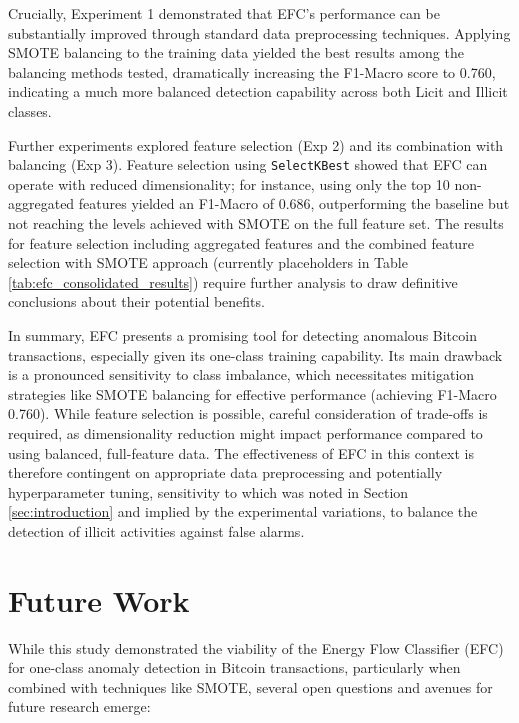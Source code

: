 \documentclass[12pt]{article}
\begin{document}
Crucially, Experiment 1 demonstrated that EFC's performance can be substantially improved through standard data preprocessing
techniques. Applying SMOTE balancing to the training data yielded the best results among the balancing methods tested,
dramatically increasing the F1-Macro score to 0.760, indicating a much more balanced detection capability across both
Licit and Illicit classes.

Further experiments explored feature selection (Exp 2) and its combination with balancing (Exp 3). Feature selection using
\texttt{SelectKBest} showed that EFC can operate with reduced dimensionality; for instance, using only the top 10 non-aggregated
features yielded an F1-Macro of 0.686, outperforming the baseline but not reaching the levels achieved with SMOTE on the full
feature set. The results for feature selection including aggregated features and the combined feature selection with SMOTE
approach (currently placeholders in Table \ref{tab:efc_consolidated_results}) require further analysis to draw definitive
conclusions about their potential benefits.

In summary, EFC presents a promising tool for detecting anomalous Bitcoin transactions, especially given its one-class
training capability. Its main drawback is a pronounced sensitivity to class imbalance, which necessitates mitigation strategies
like SMOTE balancing for effective performance (achieving F1-Macro 0.760). While feature selection is possible, careful
consideration of trade-offs is required, as dimensionality reduction might impact performance compared to using balanced,
full-feature data. The effectiveness of EFC in this context is therefore contingent on appropriate data preprocessing and
potentially hyperparameter tuning, sensitivity to which was noted in Section \ref{sec:introduction} and implied by the
experimental variations, to balance the detection of illicit activities against false alarms.


\section{Future Work} \label{sec:future_work}

While this study demonstrated the viability of the Energy Flow Classifier (EFC) for one-class anomaly detection in Bitcoin
transactions, particularly when combined with techniques like SMOTE, several open questions and avenues for future research emerge:
\end{document}
